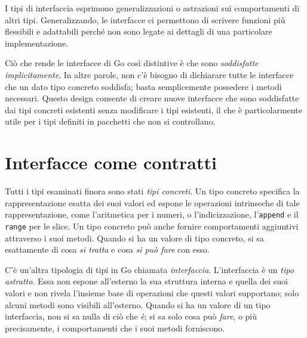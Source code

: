 I tipi di interfaccia esprimono generalizzazioni o astrazioni sui comportamenti di altri tipi.
Generalizzando, le interfacce ci permettono di scrivere funzioni più flessibili e adattabili perché non sono legate ai dettagli di una particolare implementazione.

Ciò che rende le interfacce di Go così distintive è che sono \textit{soddisfatte implicitamente}.
In altre parole, non c'è bisogno di dichiarare tutte le interfacce che un dato tipo concreto soddisfa;
basta semplicemente possedere i metodi necessari.
Questo design consente di creare nuove interfacce che sono soddisfatte dai tipi concreti esistenti senza modificare i tipi esistenti, il che è particolarmente utile per i tipi definiti in pacchetti che non si controllano.


\section{Interfacce come contratti}
\label{sec:interfacce_come_contratti}%
Tutti i tipi esaminati finora sono stati \textit{tipi concreti}.
Un tipo concreto specifica la rappresentazione esatta dei suoi valori ed espone le operazioni intrinseche di tale rappresentazione, come l'aritmetica per i numeri, o l'indicizzazione, l'\verb|append| e il \verb|range| per le slice.
Un tipo concreto può anche fornire comportamenti aggiuntivi attraverso i suoi metodi.
Quando si ha un valore di tipo concreto, si sa esattamente di cosa \textit{si tratta} e cosa \textit{si può fare} con esso.

C'è un'altra tipologia di tipi in Go chiamata \textit{interfaccia}.
L'interfaccia è un \textit{tipo astratto}.
Essa non espone all'esterno la sua struttura interna e quella dei suoi valori e non rivela l'insieme base di operazioni che questi valori supportano;
solo alcuni metodi sono visibili all'esterno.
Quando si ha un valore di un tipo interfaccia, non si sa nulla di ciò che \textit{è};
si sa solo cosa può \textit{fare}, o più precisamente, i comportamenti che i suoi metodi forniscono.

